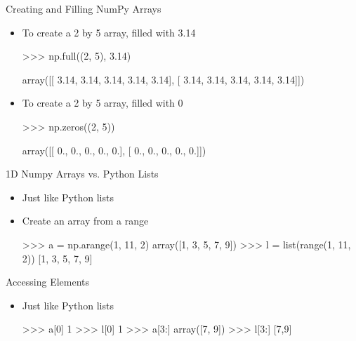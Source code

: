 \documentclass[aspectratio=169]{beamer}
\begin{document}
\begin{frame}[fragile]{Creating and Filling NumPy Arrays}

\begin{itemize}
\item To create a 2 by 5 array, filled with 3.14

\begin{SQL}
>>> np.full((2, 5), 3.14)

array([[ 3.14, 3.14, 3.14, 3.14, 3.14],
       [ 3.14, 3.14, 3.14, 3.14, 3.14]])
\end{SQL}

\item To create a 2 by 5 array, filled with 0

\begin{SQL}
>>> np.zeros((2, 5))

array([[ 0., 0., 0., 0., 0.],
       [ 0., 0., 0., 0., 0.]])
\end{SQL}
\end{itemize}
\end{frame}

\begin{frame}[fragile]{1D Numpy Arrays vs. Python Lists}

\begin{itemize}
\item Just like Python lists
\item Create an array from a range

\begin{SQL}
>>> a = np.arange(1, 11, 2)
array([1, 3, 5, 7, 9])
>>> l = list(range(1, 11, 2))
[1, 3, 5, 7, 9]
\end{SQL}


\end{itemize}
\end{frame}
\begin{frame}[fragile]{Accessing Elements}

\begin{itemize}
\item Just like Python lists

\begin{SQL}
>>> a[0]
1
>>> l[0]
1
>>> a[3:]
array([7, 9])
>>> l[3:]
[7,9]
\end{SQL}


\end{itemize}
\end{frame}
\end{document}
